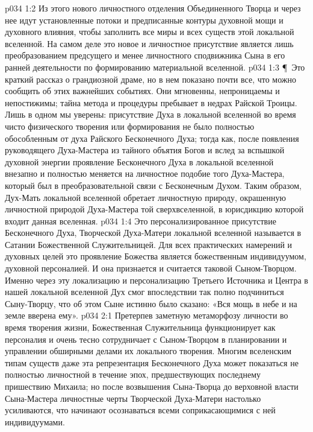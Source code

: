 \vs p034 1:2 Из этого нового личностного отделения Объединенного Творца и через нее идут установленные потоки и предписанные контуры духовной мощи и духовного влияния, чтобы заполнить все миры и всех существ этой локальной вселенной. На самом деле это новое и личностное присутствие является лишь преобразованием предсущего и менее личностного сподвижника Сына в его ранней деятельности по формированию материальной вселенной.
\vs p034 1:3 \P\ Это краткий рассказ о грандиозной драме, но в нем показано почти все, что можно сообщить об этих важнейших событиях. Они мгновенны, непроницаемы и непостижимы; тайна метода и процедуры пребывает в недрах Райской Троицы. Лишь в одном мы уверены: присутствие Духа в локальной вселенной во время чисто физического творения или формирования не было полностью обособленным от духа Райского Бесконечного Духа; тогда как, после появления руководящего Духа\hyp{}Мастера из тайного объятия Богов и вслед за вспышкой духовной энергии проявление Бесконечного Духа в локальной вселенной внезапно и полностью меняется на личностное подобие того Духа\hyp{}Мастера, который был в преобразовательной связи с Бесконечным Духом. Таким образом, Дух\hyp{}Мать локальной вселенной обретает личностную природу, окрашенную личностной природой Духа\hyp{}Мастера той сверхвселенной, в юрисдикцию которой входит данная вселенная.
\vs p034 1:4 Это персонализированное присутствие Бесконечного Духа, Творческой Духа\hyp{}Матери локальной вселенной называется в Сатании Божественной Служительницей. Для всех практических намерений и духовных целей это проявление Божества является божественным индивидуумом, духовной персоналией. И она признается и считается таковой Сыном\hyp{}Творцом. Именно через эту локализацию и персонализацию Третьего Источника и Центра в нашей локальной вселенной Дух смог впоследствии так полно подчиниться Сыну\hyp{}Творцу, что об этом Сыне истинно было сказано: «Вся мощь в небе и на земле вверена ему».
\vs p034 2:1 Претерпев заметную метаморфозу личности во время творения жизни, Божественная Служительница функционирует как персоналия и очень тесно сотрудничает с Сыном\hyp{}Творцом в планировании и управлении обширными делами их локального творения. Многим вселенским типам существ даже эта репрезентация Бесконечного Духа может показаться не полностью личностной в течение эпох, предшествующих последнему пришествию Михаила; но после возвышения Сына\hyp{}Творца до верховной власти Сына\hyp{}Мастера личностные черты Творческой Духа\hyp{}Матери настолько усиливаются, что начинают осознаваться всеми соприкасающимися с ней индивидуумами.
